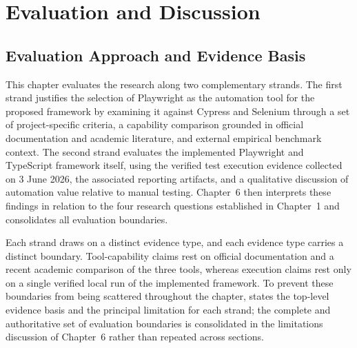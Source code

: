 \chapter{Evaluation and Discussion}
\label{ch:evaluation-and-discussion}
\begingroup
\sloppy
\setlength{\emergencystretch}{3em}

\section{Evaluation Approach and Evidence Basis}
\label{sec:ch5-evaluation-approach-evidence-basis}

This chapter evaluates the research along two complementary strands. The first strand justifies the selection of Playwright as the automation tool for the proposed framework by examining it against Cypress and Selenium through a set of project-specific criteria, a capability comparison grounded in official documentation and academic literature, and external empirical benchmark context. The second strand evaluates the implemented Playwright and TypeScript framework itself, using the verified test execution evidence collected on 3 June 2026, the associated reporting artifacts, and a qualitative discussion of automation value relative to manual testing. Chapter~6 then interprets these findings in relation to the four research questions established in Chapter~1 and consolidates all evaluation boundaries.

Each strand draws on a distinct evidence type, and each evidence type carries a distinct boundary. Tool-capability claims rest on official documentation and a recent academic comparison of the three tools, whereas execution claims rest only on a single verified local run of the implemented framework. To prevent these boundaries from being scattered throughout the chapter,  states the top-level evidence basis and the principal limitation for each strand; the complete and authoritative set of evaluation boundaries is consolidated in the limitations discussion of Chapter~6 rather than repeated across sections.

